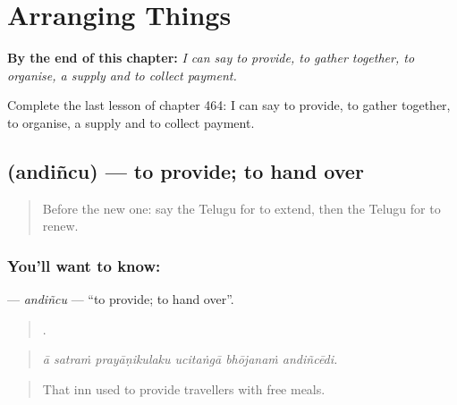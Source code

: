 
\chapter{Arranging Things}
\label{ch:te-arranging-things}

\begin{chapteropening}
\textbf{By the end of this chapter:} \emph{I can say to provide, to gather together, to organise, a supply and to collect payment.}

Complete the last lesson of chapter 464: I can say to provide, to gather together, to organise, a supply and to collect payment.
\end{chapteropening}

\section[\texorpdfstring{\te{అందించు} (andiñcu)}{అందించు (andiñcu)}]{ (andiñcu) — to provide; to hand over}

\label{lesson:TE-C464-andincu}



\begin{quote}
Before the new one: say the Telugu for to extend, then the Telugu for to renew.
\end{quote}

\subsection*{You'll want to know: }
\textbf{} — \emph{andiñcu} — \textquotedblleft{}to provide; to hand over\textquotedblright{}.

\begin{quote}
     .
\end{quote}

\begin{quote}
\emph{ā satraṁ prayāṇikulaku ucitaṅgā bhōjanaṁ andiñcēdi.}
\end{quote}

\begin{quote}
That inn used to provide travellers with free meals.
\end{quote}

